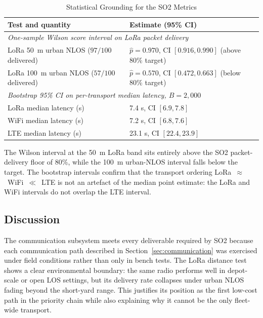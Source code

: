 \begin{table}[!htbp]
\centering
\caption{Statistical Grounding for the SO2 Metrics}
\label{tab:so2_stats}
\small
\begin{tabular}{|p{}|p{}|}
\hline
\textbf{Test and quantity} & \textbf{Estimate (95\% CI)} \\
\hline
\multicolumn{2}{|l|}{\emph{One-sample Wilson score interval on LoRa packet delivery}} \\
\hline
LoRa 50~m urban NLOS ($97/100$ delivered) & $\hat{p} = 0.970$, CI $[0.916, 0.990]$ (above 80\% target) \\
\hline
LoRa 100~m urban NLOS ($57/100$ delivered) & $\hat{p} = 0.570$, CI $[0.472, 0.663]$ (below 80\% target) \\
\hline
\multicolumn{2}{|l|}{\emph{Bootstrap 95\% CI on per-transport median latency, $B = 2{,}000$}} \\
\hline
LoRa median latency (s) & 7.4 s, CI $[6.9, 7.8]$ \\
\hline
WiFi median latency (s) & 7.2 s, CI $[6.8, 7.6]$ \\
\hline
LTE median latency (s) & 23.1 s, CI $[22.4, 23.9]$ \\
\hline
\end{tabular}
\end{table}

The Wilson interval at the 50~m LoRa band sits entirely above the SO2 packet-delivery floor of 80\%, while the 100~m urban-NLOS interval falls below the target. The bootstrap intervals confirm that the transport ordering LoRa~$\approx$~WiFi~$\ll$~LTE is not an artefact of the median point estimate: the LoRa and WiFi intervals do not overlap the LTE interval.

\FloatBarrier
\subsection{Discussion}
The communication subsystem meets every deliverable required by SO2 because each communication path described in Section~\ref{sec:communication} was exercised under field conditions rather than only in bench tests. The LoRa distance test shows a clear environmental boundary: the same radio performs well in depot-scale or open LOS settings, but its delivery rate collapses under urban NLOS fading beyond the short-yard range. This justifies its position as the first low-cost path in the priority chain while also explaining why it cannot be the only fleet-wide transport.

